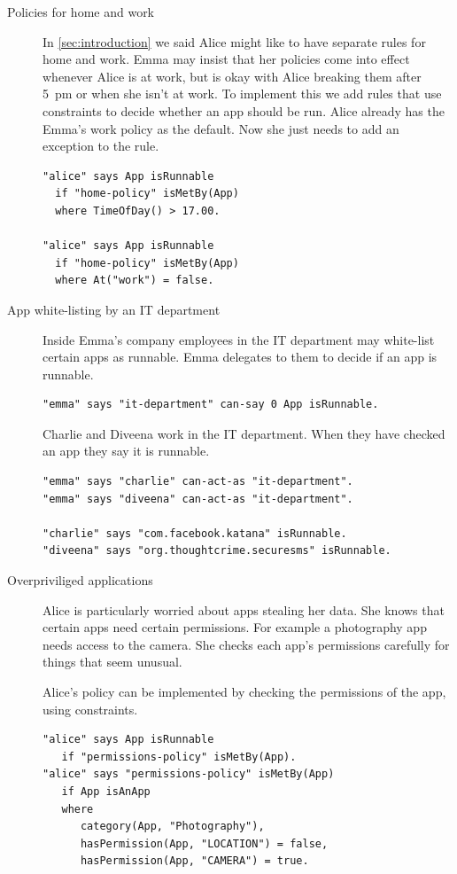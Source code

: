 \documentclass[]{llncs}
\begin{document}
\begin{description}
  \item[Policies for home and work]
    In \autoref{sec:introduction} we said Alice might like to have separate rules for home and work.
    Emma may insist that her policies come into effect whenever Alice is at work, but is okay with Alice breaking them after 5~pm or when she isn't at work.
    To implement this we add rules that use constraints to decide whether an app should be run.
    Alice already has the Emma's work policy as the default.
    Now she just needs to add an exception to the rule.
    \begin{lstlisting}
"alice" says App isRunnable
  if "home-policy" isMetBy(App)
  where TimeOfDay() > 17.00.

"alice" says App isRunnable
  if "home-policy" isMetBy(App)
  where At("work") = false.
    \end{lstlisting}

  \item[App white-listing by an IT department]
    Inside Emma's company employees in the IT department may white-list certain apps as runnable.
    Emma delegates to them to decide if an app is runnable.
    \begin{lstlisting}
"emma" says "it-department" can-say 0 App isRunnable.
    \end{lstlisting}
    Charlie and Diveena work in the IT department.
    When they have checked an app they say it is runnable.
    \begin{lstlisting}
"emma" says "charlie" can-act-as "it-department".
"emma" says "diveena" can-act-as "it-department".

"charlie" says "com.facebook.katana" isRunnable.
"diveena" says "org.thoughtcrime.securesms" isRunnable.
    \end{lstlisting}

  \item[Overpriviliged applications]
    Alice is particularly worried about apps stealing her data.
    She knows that certain apps need certain permissions.
    For example a photography app needs access to the camera.
    She checks each app's permissions carefully for things that seem unusual.

    Alice's policy can be implemented by checking the permissions of the app, using constraints.
    \begin{lstlisting}
"alice" says App isRunnable
   if "permissions-policy" isMetBy(App).
"alice" says "permissions-policy" isMetBy(App)
   if App isAnApp
   where
      category(App, "Photography"),
      hasPermission(App, "LOCATION") = false,
      hasPermission(App, "CAMERA") = true.
    \end{lstlisting}


\end{description}
\end{document}

